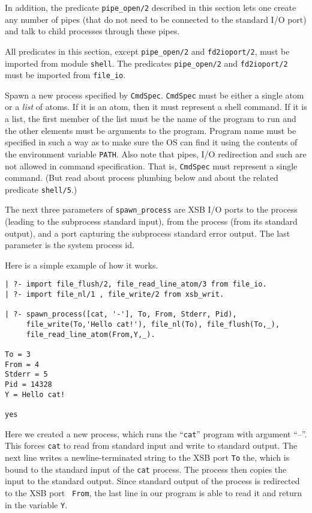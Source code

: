 In addition, the predicate {\tt pipe\_open/2} described in this section
lets one create any number of pipes (that do not need to be connected to
the standard I/O port) and talk to child processes through these pipes.

All predicates in this section, except {\tt pipe\_open/2} and
{\tt fd2ioport/2}, must be imported from module {\tt shell}.
The predicates {\tt pipe\_open/2} and
{\tt fd2ioport/2} must be imported from {\tt file\_io}.

\begin{description}
Spawn a new process specified by {\tt CmdSpec}. {\tt CmdSpec} must be
either a single atom or a \emph{list} of atoms.
If it is an atom, then it must represent a shell command.
If it is a list, the first member of the list must be the name of the
program to run and the 
other elements must be arguments to the program. Program name must be specified
in such a way as to make sure the OS can find it using the contents of the
environment variable {\tt PATH}.
Also note that pipes, I/O redirection and such are not allowed in command
specification. That is, {\tt CmdSpec} must represent a single command.
(But read about process plumbing below and about the related predicate
{\tt shell/5}.)

The next three parameters of \verb|spawn_process| are XSB I/O ports
to the process (leading to the subprocess standard input), from the process
(from its standard output), and a port capturing the
subprocess standard error output. The last parameter is the system process id.
\end{description}

\noindent
Here is a simple example of how it works.

\begin{verbatim}
| ?- import file_flush/2, file_read_line_atom/3 from file_io.
| ?- import file_nl/1 , file_write/2 from xsb_writ.  

| ?- spawn_process([cat, '-'], To, From, Stderr, Pid),
     file_write(To,'Hello cat!'), file_nl(To), file_flush(To,_),
     file_read_line_atom(From,Y,_).

To = 3
From = 4
Stderr = 5
Pid = 14328
Y = Hello cat!

yes
\end{verbatim}

Here we created a new process, which runs the ``{\tt cat}'' program
with argument ``--''. This forces {\tt cat} to read from standard input and
write to standard output. The next line writes a newline-terminated string
to the XSB port {\tt To} the, which is bound to the standard input of the
{\tt cat} process. The process then copies the input to the standard output.
Since standard output of the process is redirected to the XSB port {\tt
  From}, the last line in our program is able to read it and return in the
variable {\tt Y}.

